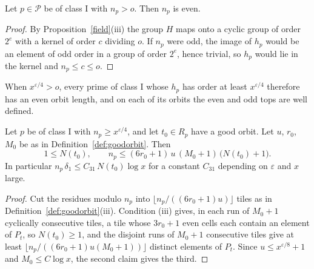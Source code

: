 \begin{lemma}\label{r2:evenorder}
Let $p\in\mathcal P$ be of class I with $n_p>o$. Then $n_p$ is even.
\end{lemma}

\begin{proof}
By Proposition~\ref{field}(iii) the group $H$ maps onto a cyclic group of order $2^e$ with a kernel of order $c$ dividing $o$. If $n_p$ were odd, the image of $h_p$ would be an element of odd order in a group of order $2^e$, hence trivial, so $h_p$ would lie in the kernel and $n_p\le c\le o$.
\end{proof}

When $x^{\varepsilon/4}>o$, every prime of class I whose $h_p$ has order at least $x^{\varepsilon/4}$ therefore has an even orbit length, and on each of its orbits the even and odd tops are well defined.

\begin{lemma}\label{r2:orbitsize}
Let $p$ be of class I with $n_p\ge x^{\varepsilon/4}$, and let $t_0\in R_p$ have a good orbit. Let $u$, $r_0$, $M_0$ be as in Definition~\ref{def:goodorbit}. Then
\[
1\le N(t_0),\qquad n_p\le(6r_0+1)\,u\,(M_0+1)\,\big(N(t_0)+1\big).
\]
In particular $n_p\,\delta_1\le C_{31}\,N(t_0)\log x$ for a constant $C_{31}$ depending on $\varepsilon$ and $x$ large.
\end{lemma}

\begin{proof}
Cut the residues modulo $n_p$ into $\lfloor n_p/((6r_0+1)u)\rfloor$ tiles as in Definition~\ref{def:goodorbit}(iii). Condition (iii) gives, in each run of $M_0+1$ cyclically consecutive tiles, a tile whose $3r_0+1$ even cells each contain an element of $P_t$, so $N(t_0)\ge1$, and the disjoint runs of $M_0+1$ consecutive tiles give at least $\lfloor n_p/((6r_0+1)u(M_0+1))\rfloor$ distinct elements of $P_t$. Since $u\le x^{\varepsilon/8}+1$ and $M_0\le C\log x$, the second claim gives the third.
\end{proof}

